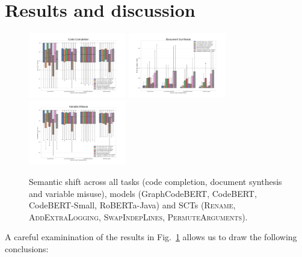 \documentclass[usenames,dvipsnames]{article} %
\begin{document}
  \section{Results and discussion}\label{sec:results}

  \vspace{-10pt}\begin{figure}[H]
          \centering\hspace*{-0.6cm}
          \includegraphics[width=0.38\textwidth]{figs/Code Completion}\hspace*{-0.6cm}
          \includegraphics[width=0.38\textwidth]{figs/Document Synthesis}\hspace*{-0.6cm}
          \includegraphics[width=0.38\textwidth]{figs/Variable Misuse}
          \caption{Semantic shift across all tasks (code completion, document synthesis and variable misuse), models (GraphCodeBERT, CodeBERT, CodeBERT-Small, RoBERTa-Java) and SCTs (\textsc{Rename}, \textsc{AddExtraLogging}, \textsc{SwapIndepLines}, \textsc{PermuteArguments}).}
      \label{fig:semantic_drift}
  \end{figure}



  A careful examinination of the results in Fig.~\ref{fig:semantic_drift} allows us to draw the following conclusions:
\end{document}
